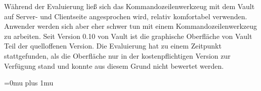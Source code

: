 \documentclass[
book,
a4paper,   
titlepage,  
halfparskip,
12pt        
]{scrartcl}
\begin{document}
\begin{onehalfspacing}
Während der Evaluierung ließ sich das Kommandozeilenwerkzeug mit dem Vault auf Server- und Clientseite angesprochen wird, relativ komfortabel verwenden. Anwender werden sich aber eher schwer tun mit einem Kommandozeilenwerkzeug zu arbeiten. Seit Version 0.10 von Vault ist die graphische Oberfläche von Vault Teil der quelloffenen Version. Die Evaluierung hat zu einem Zeitpunkt stattgefunden, als die Oberfläche nur in der kostenpflichtigen Version zur Verfügung stand und konnte aus diesem Grund nicht bewertet werden. 



\newpage
\appendix
\Urlmuskip=0mu plus 1mu



\end{onehalfspacing}
\end{document}
